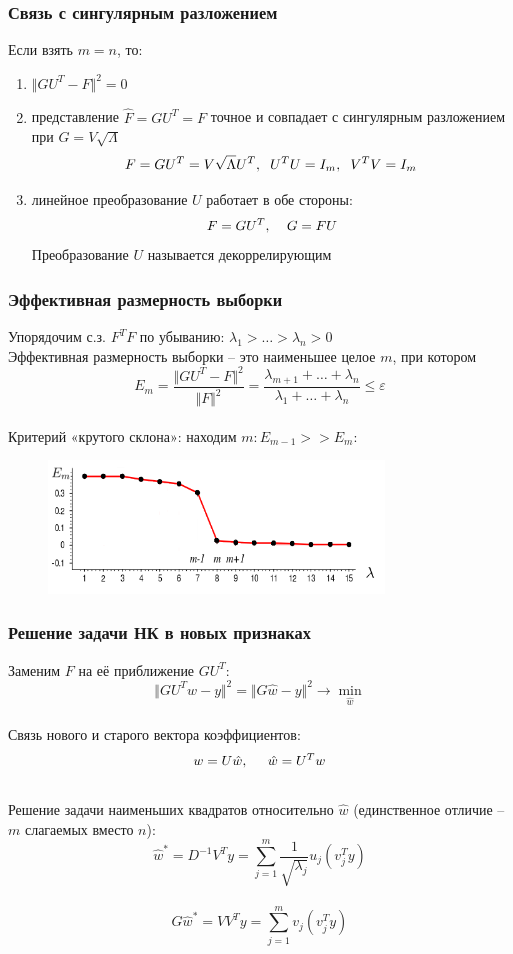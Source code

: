 \documentclass[10pt]{beamer}
\begin{document}
\begin{frame}\frametitle{Связь с сингулярным разложением}
	Если взять $m = n$, то:\\
	\begin{enumerate}[--]
	\item $\Vert GU^T - F \Vert^2 = 0$
	\item представление $\hat{F} = GU^T = F$ точное и совпадает с сингулярным разложением при $G = V \sqrt{\Lambda}$
	$$F = GU^T = V\sqrt{\Lambda}U^T, \hspace{2mm} U^TU = I_m, \hspace{2mm} V^TV = I_m$$
	\item линейное преобразование $U$ работает в обе стороны:\\
	$$F= GU^T, \hspace{4mm} G=FU$$
	Преобразование $U$ называется декоррелирующим
	\end{enumerate}
\end{frame}

\begin{frame}\frametitle{Эффективная размерность выборки}
	Упорядочим с.з. $F^TF$ по убыванию: $\lambda_1 > \dots > \lambda_n > 0$\\
	Эффективная размерность выборки -- это наименьшее целое $m$, при котором\\
	$$E_m = \frac{\Vert GU^T - F \Vert^2}{\Vert F \Vert^2} = \frac{\lambda_{m+1} + \dots + \lambda_{n}}{\lambda_1 + \dots + \lambda_n} \leq \varepsilon$$\\
	Критерий «крутого склона»: находим $m: E_{m-1} >> E_m$:
	\begin{figure}[htbp]
	  \includegraphics[height=100pt, keepaspectratio = true]{images/edge}   
	\end{figure}
\end{frame}

\begin{frame}\frametitle{Решение задачи НК в новых признаках}
	Заменим $F$ на её приближение $GU^T$:\\
	$$\Vert GU^Tw -y \Vert^2 = \Vert G\hat{w} -y \Vert^2 \rightarrow \min\limits_{\hat{w}}$$\\
	Связь нового и старого вектора коэффициентов:\\
	$$w = U\hat{w}, \hspace{5mm} \hat{w} = U^T w$$\\
	Решение задачи наименьших квадратов относительно $\hat{w}$ (единственное отличие -- $m$ слагаемых вместо $n$):\\
	$$\hat{w}^* = D^{-1}V^Ty = \sum\limits_{j=1}^m \frac{1}{\sqrt{\lambda_j}} u_j (v_j^Ty)$$\\
	$$G\hat{w}^* = VV^Ty = \sum\limits_{j=1}^m v_j (v_j^Ty)$$
\end{frame}
\end{document}
